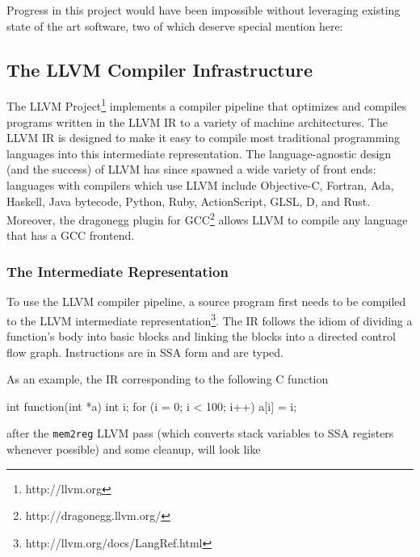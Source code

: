 Progress in this project would have been impossible without leveraging
existing state of the art software, two of which deserve special
mention here:

\subsection{The LLVM Compiler Infrastructure}

The LLVM Project\footnote{http://llvm.org} implements a compiler
pipeline that optimizes and compiles programs written in the LLVM IR
to a variety of machine architectures.  The LLVM IR is designed to
make it easy to compile most traditional programming languages into
this intermediate representation.  The language-agnostic design (and
the success) of LLVM has since spawned a wide variety of front ends:
languages with compilers which use LLVM include Objective-C, Fortran,
Ada, Haskell, Java bytecode, Python, Ruby, ActionScript, GLSL, D, and
Rust.  Moreover, the dragonegg plugin for
GCC\footnote{http://dragonegg.llvm.org/} allows LLVM to compile any
language that has a GCC frontend.

\subsubsection{The Intermediate Representation}

To use the LLVM compiler pipeline, a source program first needs to be
compiled to the LLVM intermediate
representation\footnote{http://llvm.org/docs/LangRef.html}.  The IR
follows the idiom of dividing a function's body into basic blocks and
linking the blocks into a directed control flow graph.  Instructions
are in SSA form and are typed.

As an example, the IR corresponding to the following C function

\begin{ccode}
int function(int *a) {
  int i;
  for (i = 0; i < 100; i++) {
    a[i] = i;
  }
}
\end{ccode}

after the \texttt{mem2reg} LLVM pass (which converts stack variables
to SSA registers whenever possible) and some cleanup, will look like


